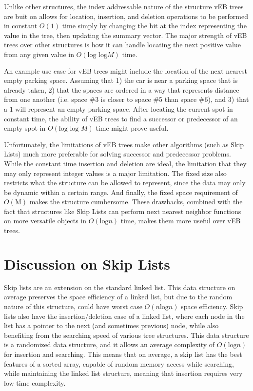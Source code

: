 \documentclass{article}
\begin{document}
Unlike other structures, the index addressable nature of the structure vEB trees are buit on allows for location, insertion, and deletion operations to be performed in constant $O(\text{1})$ time simply by changing the bit at the index representing the value in the tree, then updating the summary vector. The major strength of vEB trees over other structures is how it can handle locating the next positive value from any given value in $O(\text{log log} M)$ time.

An example use case for vEB trees might include the location of the next nearest empty parking space. Assuming that 1) the car is near a parking space that is already taken, 2) that the spaces are ordered in a way that represents distance from one another (i.e. space \#3 is closer to space \#5 than space \#6), and 3) that a 1 will represent an empty parking space. After locating the current spot in constant time, the ability of vEB trees to find a successor or predecessor of an empty spot in $O(\text{log log } M)$ time might prove useful.

Unfortunately, the limitations of vEB trees make other algorithms (such as Skip Lists) much more preferable for solving successor and predecessor problems. While the constant time insertion and deletion are ideal, the limitation that they may only represent integer values is a major limitation. The fixed size also restricts what the structure can be allowed to represent, since the data may only be dynamic within a certain range. And finally, the fixed space requirement of $O(\text{M})$ makes the structure cumbersome. These drawbacks, combined with the fact that structures like Skip Lists can perform next nearest neighbor functions on more versatile objects in $O(\text{log} n)$ time, makes them more useful over vEB trees.

\pagebreak

\section*{Discussion on Skip Lists}

Skip lists are an extension on the standard linked list. This data structure on average preserves the space efficiency of a linked list, but due to the random nature of this structure, could have worst case $O(n \text{log} n)$ space efficiency. Skip lists also have the insertion/deletion ease of a linked list, where each node in the list has a pointer to the next (and sometimes previous) node, while also benefiting from the searching speed of various tree structures. This data structure is a randomized data structure, and it allows an average complexity of $O(\text{log} n)$ for insertion and searching. This means that on average, a skip list has the best features of a sorted array, capable of random memory access while searching, while maintaining the linked list structure, meaning that insertion requires very low time complexity. 
\end{document}
